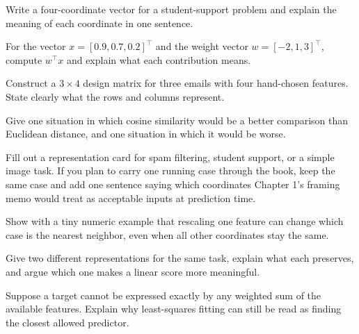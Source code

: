 \begin{exercises}
\item Write a four-coordinate vector for a student-support problem and explain the meaning of each coordinate in one sentence.
\item For the vector \(x = [0.9, 0.7, 0.2]^\top\) and the weight vector \(w = [-2, 1, 3]^\top\), compute \(w^\top x\) and explain what each contribution means.
\item Construct a \(3 \times 4\) design matrix for three emails with four hand-chosen features. State clearly what the rows and columns represent.
\item Give one situation in which cosine similarity would be a better comparison than Euclidean distance, and one situation in which it would be worse.
\item Fill out a representation card for spam filtering, student support, or a simple image task. If you plan to carry one running case through the book, keep the same case and add one sentence saying which coordinates Chapter 1's framing memo would treat as acceptable inputs at prediction time.
\end{exercises}

\begin{challengeexercises}
\item Show with a tiny numeric example that rescaling one feature can change which case is the nearest neighbor, even when all other coordinates stay the same.
\item Give two different representations for the same task, explain what each preserves, and argue which one makes a linear score more meaningful.
\item Suppose a target cannot be expressed exactly by any weighted sum of the available features. Explain why least-squares fitting can still be read as finding the closest allowed predictor.
\end{challengeexercises}
